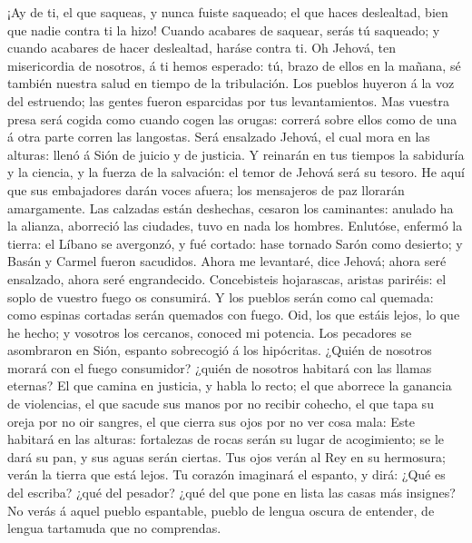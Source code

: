  ¡Ay de ti, el que saqueas, y nunca fuiste saqueado; el
que haces deslealtad, bien que nadie contra ti la hizo! Cuando acabares
de saquear, serás tú saqueado; y cuando acabares de hacer deslealtad,
haráse contra ti.  Oh Jehová, ten misericordia de
nosotros, á ti hemos esperado: tú, brazo de ellos en la mañana, sé
también nuestra salud en tiempo de la tribulación.  Los
pueblos huyeron á la voz del estruendo; las gentes fueron esparcidas por
tus levantamientos.  Mas vuestra presa será cogida como
cuando cogen las orugas: correrá sobre ellos como de una á otra parte
corren las langostas.  Será ensalzado Jehová, el cual mora
en las alturas: llenó á Sión de juicio y de justicia.  Y
reinarán en tus tiempos la sabiduría y la ciencia, y la fuerza de la
salvación: el temor de Jehová será su tesoro.  He aquí que
sus embajadores darán voces afuera; los mensajeros de paz llorarán
amargamente.  Las calzadas están deshechas, cesaron los
caminantes: anulado ha la alianza, aborreció las ciudades, tuvo en nada
los hombres.  Enlutóse, enfermó la tierra: el Líbano se
avergonzó, y fué cortado: hase tornado Sarón como desierto; y Basán y
Carmel fueron sacudidos.  Ahora me levantaré, dice
Jehová; ahora seré ensalzado, ahora seré engrandecido. 
Concebisteis hojarascas, aristas pariréis: el soplo de vuestro fuego os
consumirá.  Y los pueblos serán como cal quemada: como
espinas cortadas serán quemados con fuego.  Oid, los que
estáis lejos, lo que he hecho; y vosotros los cercanos, conoced mi
potencia.  Los pecadores se asombraron en Sión, espanto
sobrecogió á los hipócritas. ¿Quién de nosotros morará con el fuego
consumidor? ¿quién de nosotros habitará con las llamas eternas?
 El que camina en justicia, y habla lo recto; el que
aborrece la ganancia de violencias, el que sacude sus manos por no
recibir cohecho, el que tapa su oreja por no oir sangres, el que cierra
sus ojos por no ver cosa mala:  Este habitará en las
alturas: fortalezas de rocas serán su lugar de acogimiento; se le dará
su pan, y sus aguas serán ciertas.  Tus ojos verán al Rey
en su hermosura; verán la tierra que está lejos.  Tu
corazón imaginará el espanto, y dirá: ¿Qué es del escriba? ¿qué del
pesador? ¿qué del que pone en lista las casas más insignes?
 No verás á aquel pueblo espantable, pueblo de lengua
oscura de entender, de lengua tartamuda que no comprendas.
